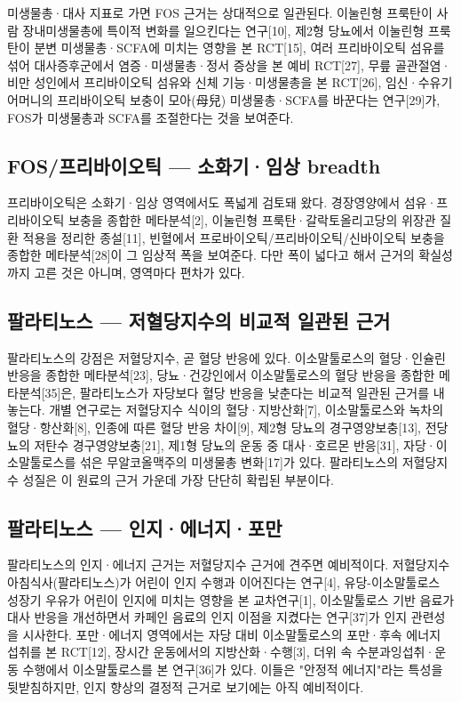 \documentclass[12pt,oneside]{book}
\begin{document}
미생물총·대사 지표로 가면 FOS 근거는 상대적으로 일관된다. 이눌린형 프룩탄이 사람 장내미생물총에 특이적 변화를 일으킨다는 연구[10], 제2형 당뇨에서 이눌린형 프룩탄이 분변 미생물총·SCFA에 미치는 영향을 본 RCT[15], 여러 프리바이오틱 섬유를 섞어 대사증후군에서 염증·미생물총·정서 증상을 본 예비 RCT[27], 무릎 골관절염·비만 성인에서 프리바이오틱 섬유와 신체 기능·미생물총을 본 RCT[26], 임신·수유기 어머니의 프리바이오틱 보충이 모아(母兒) 미생물총·SCFA를 바꾼다는 연구[29]가, FOS가 미생물총과 SCFA를 조절한다는 것을 보여준다.

\subsection{FOS/프리바이오틱 — 소화기·임상 breadth}

프리바이오틱은 소화기·임상 영역에서도 폭넓게 검토돼 왔다. 경장영양에서 섬유·프리바이오틱 보충을 종합한 메타분석[2], 이눌린형 프룩탄·갈락토올리고당의 위장관 질환 적용을 정리한 종설[11], 빈혈에서 프로바이오틱/프리바이오틱/신바이오틱 보충을 종합한 메타분석[28]이 그 임상적 폭을 보여준다. 다만 폭이 넓다고 해서 근거의 확실성까지 고른 것은 아니며, 영역마다 편차가 있다.

\subsection{팔라티노스 — 저혈당지수의 비교적 일관된 근거}

팔라티노스의 강점은 저혈당지수, 곧 혈당 반응에 있다. 이소말툴로스의 혈당·인슐린 반응을 종합한 메타분석[23], 당뇨·건강인에서 이소말툴로스의 혈당 반응을 종합한 메타분석[35]은, 팔라티노스가 자당보다 혈당 반응을 낮춘다는 비교적 일관된 근거를 내놓는다. 개별 연구로는 저혈당지수 식이의 혈당·지방산화[7], 이소말툴로스와 녹차의 혈당·항산화[8], 인종에 따른 혈당 반응 차이[9], 제2형 당뇨의 경구영양보충[13], 전당뇨의 저탄수 경구영양보충[21], 제1형 당뇨의 운동 중 대사·호르몬 반응[31], 자당·이소말툴로스를 섞은 무알코올맥주의 미생물총 변화[17]가 있다. 팔라티노스의 저혈당지수 성질은 이 원료의 근거 가운데 가장 단단히 확립된 부분이다.

\subsection{팔라티노스 — 인지·에너지·포만}

팔라티노스의 인지·에너지 근거는 저혈당지수 근거에 견주면 예비적이다. 저혈당지수 아침식사(팔라티노스)가 어린이 인지 수행과 이어진다는 연구[4], 유당-이소말툴로스 성장기 우유가 어린이 인지에 미치는 영향을 본 교차연구[1], 이소말툴로스 기반 음료가 대사 반응을 개선하면서 카페인 음료의 인지 이점을 지켰다는 연구[37]가 인지 관련성을 시사한다. 포만·에너지 영역에서는 자당 대비 이소말툴로스의 포만·후속 에너지 섭취를 본 RCT[12], 장시간 운동에서의 지방산화·수행[3], 더위 속 수분과잉섭취·운동 수행에서 이소말툴로스를 본 연구[36]가 있다. 이들은 "안정적 에너지"라는 특성을 뒷받침하지만, 인지 향상의 결정적 근거로 보기에는 아직 예비적이다.
\end{document}
